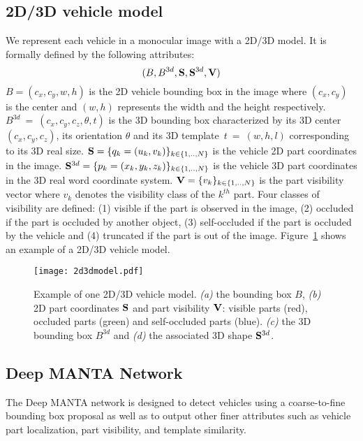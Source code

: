 \documentclass[10pt,twocolumn,letterpaper]{article}
\begin{document}
\subsection{2D/3D vehicle model}
\label{Vehicle shape model}

We represent each vehicle in a monocular image with a 2D/3D model. It is formally defined by the following attributes:
\begin{equation}
(B, B^{3d}, \bold{S}, \bold{S}^{3d}, \bold{V}) \notag
\end{equation}
$B=(c_x,c_y,w,h)$ is the 2D vehicle bounding box in the image where $(c_x,c_y)$ is the center and $(w,h)$ represents the width and the height respectively.~$B^{3d}~=~(c_x,c_y,c_z,\theta, t)$ is the 3D bounding box characterized by its 3D center $(c_x,c_y,c_z)$, its orientation $\theta$ and its 3D template~$t~=~(w,h,l)$ corresponding to its 3D real size. $\bold{S}=\{q_k = (u_k,v_k) \}_{k \in \{1,..,N\}}$ is the vehicle 2D part coordinates in the image. $\bold{S}^{3d}=\{p_k =(x_k,y_k,z_k) \}_{k \in \{1,..,N\}}$ is the vehicle 3D part coordinates in the 3D real word coordinate system. $\bold{V} = \{v_k\}_{k \in \{1,..,N\}}$ is the part visibility vector where $v_k$ denotes the visibility class of the $k^{th}$ part. Four classes of visibility are defined: (1) visible if the part is observed in the image, (2) occluded if the part is occluded by another object, (3) self-occluded if the part is occluded by the vehicle and (4) truncated if the part is out of the image. Figure~\ref{fig:vis} shows an example of a 2D/3D vehicle model.  

\begin{figure}[ht]
\texttt{[image: 2d3dmodel.pdf]}
\centering
\vspace{-1mm}
\caption{Example of one 2D/3D vehicle model. \textit{(a)} the bounding box $B$, \textit{(b)} 2D part coordinates $\bold{S}$ and part visibility $\bold{V}$: visible parts (red), occluded parts (green) and self-occluded parts (blue). \textit{(c)} the 3D bounding box $B^{3d}$ and \textit{(d)} the associated 3D shape $\bold{S}^{3d}$.}
\label{fig:vis}
\end{figure}

\subsection{Deep MANTA Network}
\label{Deep MANTA network}

The Deep MANTA network is designed to detect vehicles using a coarse-to-fine bounding box proposal as well as to output other finer attributes such as vehicle part localization, part visibility, and template similarity.
\end{document}
